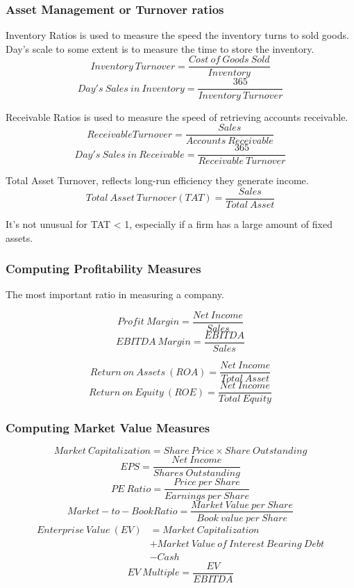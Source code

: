 \documentclass[10pt, a4paper]{article}
\begin{document}
        \subsubsection{Asset Management or Turnover  ratios}
        
        Inventory Ratios is used to measure the speed the inventory turns to sold goods. Day's scale to some extent is to measure the time to store the inventory.
            $$Inventory\ Turnover = \frac{Cost\ of\ Goods\ Sold}{Inventory}$$
            $$Day's\ Sales\ in\ Inventory = \frac{365}{Inventory\ Turnover}$$
        
        Receivable Ratios is used to measure the speed of retrieving accounts receivable.
            $$Receivable Turnover = \frac{Sales}{Accounts\ Receivable}$$
            $$Day's\ Sales\ in\ Receivable = \frac{365}{Receivable\ Turnover}$$

        Total Asset Turnover, reflects long-run efficiency they generate income. 
            $$Total\ Asset\ Turnover(TAT) = \frac{Sales}{Total\ Asset}$$

            It's not unusual for TAT < 1, especially if a firm has a large amount of fixed assets.  
        \subsubsection{Computing Profitability Measures}    
            The most important ratio in measuring a company.

            $$Profit\ Margin = \frac{Net\ Income}{Sales}$$
            $$EBITDA\ Margin = \frac{EBITDA}{Sales}$$
            
            

            $$Return\ on\ Assets\ (ROA) = \frac{Net\ Income}{Total\ Asset}$$
            $$Return\ on\ Equity\ (ROE) = \frac{Net\ Income}{Total\ Equity}$$
        \subsubsection{Computing Market Value Measures}
            $$Market\ Capitalization = Share\ Price \times Share\ Outstanding$$
            $$EPS = \frac{Net\ Income}{Shares\ Outstanding}$$
            $$PE\ Ratio = \frac{Price\ per\ Share}{Earnings\ per\ Share}$$
            $$Market-to-Book Ratio = \frac{Market\ Value\ per\ Share}{Book\ value\ per\ Share}$$
            \begin{align*}
                Enterprise\ Value\ (EV) &= Market\ Capitalization \\
                                        &+ Market\ Value\ of\ Interest\ Bearing\ Debt \\
                                        &- Cash
            \end{align*}
            $$EV\ Multiple = \frac{EV}{EBITDA}$$
        
\end{document}
